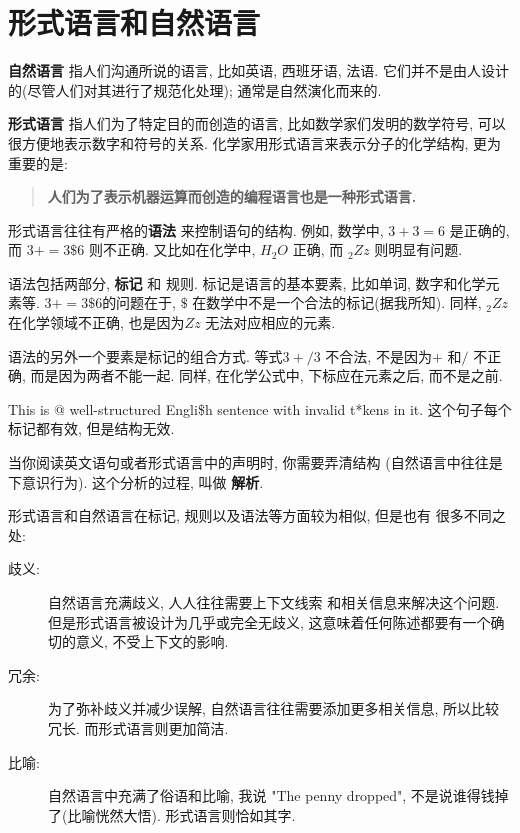 \documentclass[10pt]{book}
\begin{document}



\section{形式语言和自然语言}

{\bf 自然语言} 指人们沟通所说的语言, 比如英语, 西班牙语, 法语. 
它们并不是由人设计的(尽管人们对其进行了规范化处理); 通常是自然演化而来的. 


{\bf 形式语言} 指人们为了特定目的而创造的语言, 
比如数学家们发明的数学符号, 
可以很方便地表示数字和符号的关系. 
化学家用形式语言来表示分子的化学结构, 更为重要的是:

\begin{quote}
{\bf 人们为了表示机器运算而创造的编程语言也是一种形式语言. }
\end{quote}

形式语言往往有严格的{\bf 语法} 来控制语句的结构. 例如, 
数学中, $3 + 3 = 6$ 是正确的, 而 $3 + = 3 \$ 6$ 则不正确. 
又比如在化学中, $H_2O$ 正确, 而 $_2Zz$ 则明显有问题. 

语法包括两部分, {\bf 标记} 和 规则. 
标记是语言的基本要素, 比如单词, 数字和化学元素等. 
$3 += 3 \$ 6$的问题在于, \(\$\) 在数学中不是一个合法的标记(据我所知). 
同样, $_2Zz$ 在化学领域不正确, 也是因为$Zz$ 无法对应相应的元素. 

语法的另外一个要素是标记的组合方式. 
等式$3 +/ 3$ 不合法, 不是因为$+$ 和$/$ 不正确, 而是因为两者不能一起. 
同样, 在化学公式中, 下标应在元素之后, 而不是之前. 

This is @ well-structured Engli\$h
sentence with invalid t*kens in it. 这个句子每个标记都有效, 
但是结构无效. 

当你阅读英文语句或者形式语言中的声明时, 
你需要弄清结构
(自然语言中往往是下意识行为). 这个分析的过程, 叫做 {\bf 解析}. 

形式语言和自然语言在标记, 规则以及语法等方面较为相似, 但是也有
很多不同之处:

\begin{description}

\item[歧义:] 自然语言充满歧义, 人人往往需要上下文线索
和相关信息来解决这个问题. 但是形式语言被设计为几乎或完全无歧义, 
这意味着任何陈述都要有一个确切的意义, 不受上下文的影响. 

\item[冗余:] 为了弥补歧义并减少误解, 
自然语言往往需要添加更多相关信息, 所以比较冗长. 
而形式语言则更加简洁. 

\item[比喻:] 自然语言中充满了俗语和比喻, 我说 "The penny dropped", 
不是说谁得钱掉了(比喻恍然大悟). 形式语言则恰如其字. 

\end{description}
\end{document}

